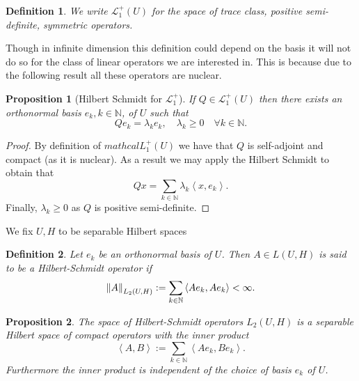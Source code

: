 \documentclass[12pt]{article}
\newcommand{\br}[1]{\left\langle#1\right\rangle}
\newcommand{\N}{\mathbb{N}}
\newtheorem{proposition}{Proposition}
\newtheorem{definition}{Definition}
\begin{document}
\begin{definition}
	We write $\mathcal{L}_1^+(U)$ for the space of trace class, positive semi-definite, symmetric operators.
\end{definition}
Though in infinite dimension this definition could depend on the basis it will not do so for the class of linear operators we are interested in. This is because due to the following result all these operators are nuclear.
\begin{proposition}[Hilbert Schmidt for $\mathcal{L}_1^+$]
	If $Q \in \mathcal{L}_1^+(U)$ then there exists an orthonormal basis $e_{k}, k \in \mathbb{N}$, of $U$ such that
	$$
		Q e_{k}=\lambda_{k} e_{k}, \quad \lambda_{k} \geq 0\quad \forall k \in \mathbb{N}.
	$$
\end{proposition}
\begin{proof}
	By definition of $mathcal{L}_1^+(U)$ we have that $Q$ is self-adjoint and compact (as it is nuclear).
	As a result we may apply the Hilbert Schmidt  to obtain that
	\begin{equation*}
		Q x=\sum_{k\in\N}\lambda_{k} \br{x,e_{k}}.
	\end{equation*}
	Finally, $\lambda_k\geq 0$ as $Q$ is positive semi-definite.
\end{proof}
We fix $U,H$ to be separable Hilbert spaces
\begin{definition}
	Let $e_k$ be an orthonormal basis of $U$. Then $A\in L(U,H)$ is said to be a \emph{Hilbert-Schmidt} operator if
	\begin{equation*}
		\norm{A}_{L_2(U,H)}:=\sum_{k\in\mathbb{N}}\br{Ae_k,Ae_k}<\infty.
	\end{equation*}
\end{definition}
\begin{proposition}
	The space of Hilbert-Schmidt operators $L_2(U,H)$ is a separable Hilbert space of compact operators with the inner product
	\begin{equation*}
		\br{A,B}:=\sum_{k\in\mathbb{N}}\br{Ae_k,Be_k}.
	\end{equation*}
	Furthermore the inner product is independent of the choice of basis $e_k$ of $U$.
\end{proposition}
\end{document}
